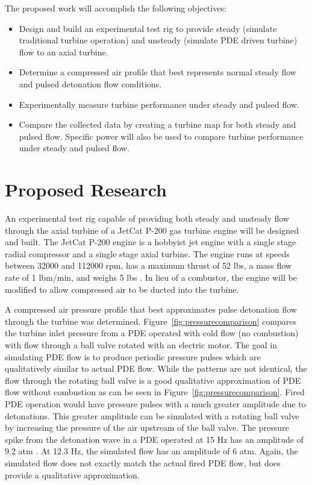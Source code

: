 \documentclass[12pt, letterpaper]{article}
\begin{document}
The proposed work will accomplish the following objectives:

\begin{itemize}

	\item Design and build an experimental test rig to provide steady (simulate traditional turbine operation) and unsteady (simulate PDE driven turbine) flow to an axial turbine.

	\item Determine a compressed air profile that best represents normal steady flow and pulsed detonation flow conditions.

	\item Experimentally measure turbine performance under steady and pulsed flow.

	\item Compare the collected data by creating a turbine map for both steady and pulsed flow. Specific power will also be used to compare turbine performance under steady and pulsed flow.

\end{itemize}

\section{Proposed Research}

An experimental test rig capable of providing both steady and unsteady flow through the axial turbine of a JetCat P-200 gas turbine engine will be designed and built. The JetCat P-200 engine is a hobbyist jet engine with a single stage radial compressor and a single stage axial turbine. The engine runs at speeds between 32000 and 112000 rpm, has a maximum thrust of 52 lbs, a mass flow rate of 1 lbm/min, and weighs 5 lbs \cite{jetcat}. In lieu of a combustor, the engine will be modified to allow compressed air to be ducted into the turbine.

A compressed air pressure profile that best approximates pulse detonation flow through the turbine was determined. Figure~\ref{fig:pressurecomparison} compares the turbine inlet pressure from a PDE operated with cold flow (no combustion) with flow through a ball valve rotated with an electric motor. The goal in simulating PDE flow is to produce periodic pressure pulses which are qualitatively similar to actual PDE flow. While the patterns are not identical, the flow through the rotating ball valve is a good qualitative approximation of PDE flow without combustion as can be seen in Figure~\ref{fig:pressurecomparison}. Fired PDE operation would have pressure pulses with a much greater amplitude due to detonations. This greater amplitude can be simulated with a rotating ball valve by increasing the pressure of the air upstream of the ball valve. The pressure spike from the detonation wave in a PDE operated at 15 Hz has an amplitude of 9.2 atm \cite{Rouser2011:Time-Accurate}. At 12.3 Hz, the simulated flow has an amplitude of 6 atm. Again, the simulated flow does not exactly match the actual fired PDE flow, but does provide a qualitative approximation. 
\end{document}
